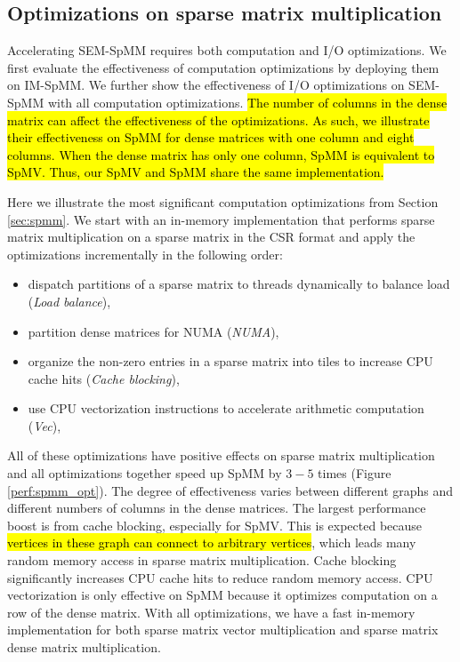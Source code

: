 \subsection{Optimizations on sparse matrix multiplication} \label{sec:opts}
Accelerating SEM-SpMM requires both computation and I/O optimizations.
We first evaluate the effectiveness of computation optimizations by deploying
them on IM-SpMM. We further show the effectiveness of I/O optimizations on
SEM-SpMM with all computation optimizations. \hl{The number of columns in
the dense matrix can affect the effectiveness of the optimizations. As such,
we illustrate their effectiveness on SpMM for dense matrices with one column
and eight columns. When the dense matrix has only one column, SpMM is equivalent
to SpMV. Thus, our SpMV and SpMM share the same implementation.}

Here we illustrate the most significant computation optimizations from Section
\ref{sec:spmm}. We start with an in-memory implementation that
performs sparse matrix multiplication on a sparse matrix in the CSR format
and apply the optimizations incrementally in the following order:
\begin{itemize} \itemsep1pt \parskip0pt 
	\item dispatch partitions of a sparse matrix to threads dynamically
		to balance load (\textit{Load balance}),
	\item partition dense matrices for NUMA (\textit{NUMA}),
	\item organize the non-zero entries in a sparse matrix into tiles to
		increase CPU cache hits (\textit{Cache blocking}),
	\item use CPU vectorization instructions to accelerate arithmetic
		computation (\textit{Vec}),
\end{itemize}

All of these optimizations have positive effects on sparse matrix
multiplication and all optimizations together speed up SpMM by $3-5$ times
(Figure \ref{perf:spmm_opt}). The degree of effectiveness
varies between different graphs and different numbers of columns in
the dense matrices. The largest performance boost is from cache blocking,
especially for SpMV. This is expected because \hl{vertices in these graph can
connect to arbitrary vertices}, which leads many random memory access in sparse matrix
multiplication. Cache blocking significantly increases CPU cache hits to reduce
random memory access. CPU vectorization is only effective on SpMM because
it optimizes computation on a row of the dense matrix.
With all optimizations, we have a fast in-memory implementation for both
sparse matrix vector multiplication and sparse matrix dense matrix multiplication.

